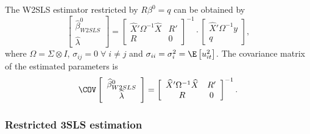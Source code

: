 The W2SLS estimator restricted by $R \beta^0 = q$ can be obtained by
\begin{equation}
   \left[ \begin{array}{c}
      \widehat{\beta}^0_{W2SLS} \\ \widehat{\lambda}
   \end{array} \right]
   =
   \left[ \begin{array}{cc}
      \widehat{X}' \Omega^{-1} \widehat{X} & R' \\ 
      R & 0
   \end{array} \right]^{-1}
   \cdot
   \left[ \begin{array}{c}
      \widehat{X}' \Omega^{-1} y \\ q 
   \end{array} \right] ,
\end{equation}
where $\Omega = \Sigma \otimes I$,
$\sigma_{ij} = 0 \; \forall \; i \neq j$ and
$\sigma_{ii} = \sigma_i^2 = \E \left[ u_{it}^2 \right]$.
The covariance matrix of the estimated parameters is
\begin{equation}
   \COV
   \left[ \begin{array}{c}
      \widehat{\beta}^0_{W2SLS} \\ \widehat{\lambda}
   \end{array} \right] 
   = 
   \left[ \begin{array}{cc}
      \widehat{X}' \Omega^{-1} \widehat{X} & R' \\ 
      R & 0
   \end{array} \right]^{-1} .
\end{equation}


\subsubsection{Restricted 3SLS estimation}

